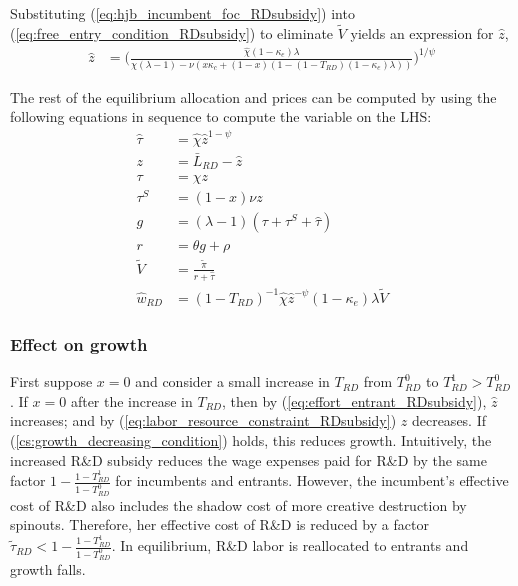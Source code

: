 \documentclass[11pt,english]{article}
\theoremstyle{remark}
\begin{document}
Substituting (\ref{eq:hjb_incumbent_foc_RDsubsidy}) into (\ref{eq:free_entry_condition_RDsubsidy}) to eliminate $\tilde{V}$ yields an expression for $\hat{z}$, 
\begin{align}
\hat{z} &= \Bigg( \frac{\hat{\chi} (1-\kappa_{e}) \lambda}{\chi(\lambda -1) - \nu (x\kappa_c + (1-x)(1 - (1-T_{RD})(1-\kappa_e)\lambda)) } \Bigg)^{1/\psi} \label{eq:effort_entrant_RDsubsidy}
\end{align}

The rest of the equilibrium allocation and prices can be computed by using the following equations in sequence to compute the variable on the LHS:
\begin{align}
	\hat{\tau} &= \hat{\chi} \hat{z}^{1-\psi} \\
	z &= \bar{L}_{RD} - \hat{z} \label{eq:labor_resource_constraint_RDsubsidy}\\ 
	\tau &= \chi z \\
	\tau^S &= (1-x) \nu z \\
	g &= (\lambda - 1) (\tau + \tau^S + \hat{\tau}) \\
	r &= \theta g + \rho \\
	\tilde{V} &= \frac{\tilde{\pi}}{r + \hat{\tau}} \\ 
	\hat{w}_{RD} &= (1-T_{RD})^{-1}\hat{\chi} \hat{z}^{-\psi} (1-\kappa_e) \lambda \tilde{V} \label{eq:wage_rd_labor_RDsubsidy}
\end{align}

\subsubsection{Effect on growth}

First suppose $x = 0$ and consider a small increase in $T_{RD}$ from $T_{RD}^0$ to $T_{RD}^1 > T_{RD}^0$. If $x = 0$ after the increase in $T_{RD}$, then by (\ref{eq:effort_entrant_RDsubsidy}), $\hat{z}$ increases; and by (\ref{eq:labor_resource_constraint_RDsubsidy}) $z$ decreases. If (\ref{cs:growth_decreasing_condition}) holds, this reduces growth. Intuitively, the increased R\&D subsidy reduces the wage expenses paid for R\&D by the same factor $1-\frac{1-T_{RD}^1}{1-T_{RD}^0}$ for incumbents and entrants. However, the incumbent's effective cost of R\&D also includes the shadow cost of more creative destruction by spinouts. Therefore, her effective cost of R\&D is reduced by a factor $\tilde{\tau}_{RD} < 1-\frac{1-T_{RD}^1}{1-T_{RD}^0}$. In equilibrium, R\&D labor is reallocated to entrants and growth falls.
\end{document}
